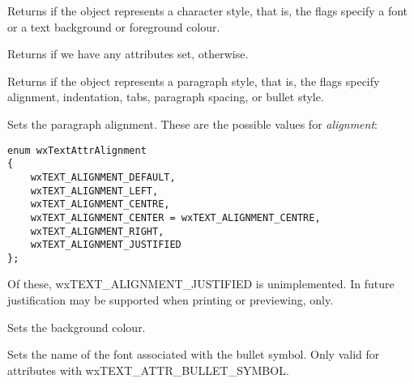 Returns \true if the object represents a character style, that is,
the flags specify a font or a text background or foreground colour.

\label{wxrichtextattrisdefault}


Returns \false if we have any attributes set, \true otherwise.

\label{wxrichtextattrisparagraphstyle}


Returns \true if the object represents a paragraph style, that is,
the flags specify alignment, indentation, tabs, paragraph spacing, or
bullet style.

\label{wxrichtextattrsetalignment}


Sets the paragraph alignment. These are the possible values for {\it alignment}:

{\small
\begin{verbatim}
enum wxTextAttrAlignment
{
    wxTEXT_ALIGNMENT_DEFAULT,
    wxTEXT_ALIGNMENT_LEFT,
    wxTEXT_ALIGNMENT_CENTRE,
    wxTEXT_ALIGNMENT_CENTER = wxTEXT_ALIGNMENT_CENTRE,
    wxTEXT_ALIGNMENT_RIGHT,
    wxTEXT_ALIGNMENT_JUSTIFIED
};
\end{verbatim}
}

Of these, wxTEXT\_ALIGNMENT\_JUSTIFIED is unimplemented. In future justification may be supported
when printing or previewing, only.

\label{wxrichtextattrsetbackgroundcolour}


Sets the background colour.

\label{wxrichtextattrsetbulletfont}


Sets the name of the font associated with the bullet symbol.
Only valid for attributes with wxTEXT\_ATTR\_BULLET\_SYMBOL.

\label{wxrichtextattrsetbulletname}

